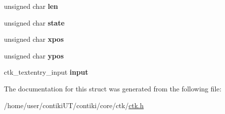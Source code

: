 \begin{DoxyCompactItemize}
\item 
\hypertarget{structctk__textentry_a66daac2baa517de9d520573761b6c4d8}{}unsigned char {\bfseries len}\label{structctk__textentry_a66daac2baa517de9d520573761b6c4d8}

\item 
\hypertarget{structctk__textentry_af628d08fc53c3213ff3597d445c740bd}{}unsigned char {\bfseries state}\label{structctk__textentry_af628d08fc53c3213ff3597d445c740bd}

\item 
\hypertarget{structctk__textentry_ae505f1f15a28e494fb89b66d840b5f86}{}unsigned char {\bfseries xpos}\label{structctk__textentry_ae505f1f15a28e494fb89b66d840b5f86}

\item 
\hypertarget{structctk__textentry_aa2d9ade63ca4d55425bca5bc0a7390b8}{}unsigned char {\bfseries ypos}\label{structctk__textentry_aa2d9ade63ca4d55425bca5bc0a7390b8}

\item 
\hypertarget{structctk__textentry_a564284b63609a4c023bb6f8801358141}{}ctk\+\_\+textentry\+\_\+input {\bfseries input}\label{structctk__textentry_a564284b63609a4c023bb6f8801358141}

\end{DoxyCompactItemize}


The documentation for this struct was generated from the following file\+:\begin{DoxyCompactItemize}
\item 
/home/user/contiki\+U\+T/contiki/core/ctk/\hyperlink{ctk_8h}{ctk.\+h}\end{DoxyCompactItemize}

